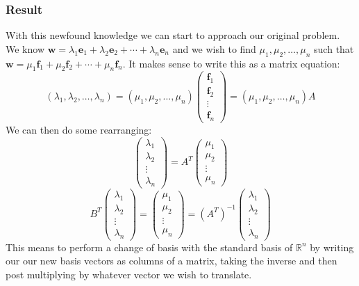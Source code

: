 \documentclass[12pt]{article}
\newcommand{\arbreal}[2]{{#1}_1,{#1}_2,\dots,{#1}_{#2}}
\begin{document}
\subsubsection*{Result}
With this newfound knowledge we can start to approach our original problem. We know \(\textbf{w}=\lambda_1\textbf{e}_1+\lambda_2\textbf{e}_2+\cdots+\lambda_n\textbf{e}_n\) and we wish to find \(\arbreal{\mu}{n}\) such that \(\textbf{w}=\mu_1\textbf{f}_1+\mu_2\textbf{f}_2+\cdots+\mu_n\textbf{f}_n\). It makes sense to write this as a matrix equation:
\[(\arbreal{\lambda}{n})=(\arbreal{\mu}{n})\begin{pmatrix}
    \textbf{f}_1 \\
    \textbf{f}_2 \\
    \vdots \\
    \textbf{f}_n
\end{pmatrix}=(\arbreal{\mu}{n})A\]
We can then do some rearranging:
\[\begin{pmatrix}
    \lambda_1 \\
    \lambda_2 \\
    \vdots \\
    \lambda_n
\end{pmatrix}=A^T\begin{pmatrix}
    \mu_1 \\
    \mu_2 \\
    \vdots \\
    \mu_n
\end{pmatrix}\]
\[B^T\begin{pmatrix}
    \lambda_1 \\
    \lambda_2 \\
    \vdots \\
    \lambda_n
\end{pmatrix}=\begin{pmatrix}
    \mu_1 \\
    \mu_2 \\
    \vdots \\
    \mu_n
\end{pmatrix}=(A^T)^{-1}\begin{pmatrix}
    \lambda_1 \\
    \lambda_2 \\
    \vdots \\
    \lambda_n
\end{pmatrix}\]
This means to perform a change of basis with the standard basis of \(\mathbb{R}^n\) by writing our our new basis vectors as columns of a matrix, taking the inverse and then post multiplying by whatever vector we wish to translate.
\end{document}
